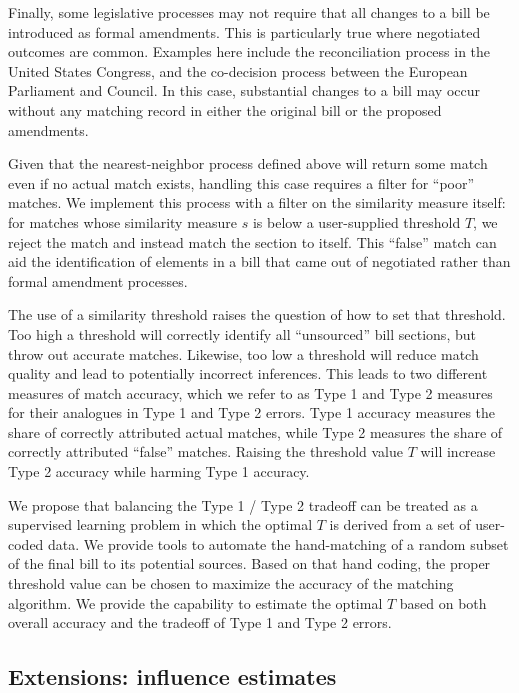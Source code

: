 \documentclass[11pt]{article}
\begin{document}
Finally, some legislative processes may not require that all changes
to a bill be introduced as formal amendments. This is particularly
true where negotiated outcomes are common. Examples here include the
reconciliation process in the United States Congress, and the
co-decision process between the European Parliament and Council. In
this case, substantial changes to a bill may occur without any
matching record in either the original bill or the proposed
amendments. 

Given that the nearest-neighbor process defined above will return some
match even if no actual match exists, handling this case requires a
filter for ``poor'' matches. We implement this process with a filter
on the similarity measure itself: for matches whose similarity
measure $s$ is below a user-supplied threshold $T$, we reject the
match and instead match the section to itself. This ``false'' match
can aid the identification of elements in a bill that
came out of negotiated rather than formal amendment processes. 

The use of a similarity threshold raises the question of how to set
that threshold. Too high a threshold will correctly identify all ``unsourced'' bill
sections, but throw out accurate matches. Likewise, too low a threshold
will reduce match quality and lead to potentially incorrect
inferences. This leads to two different measures of match accuracy,
which we refer to as Type 1 and Type 2 measures for their analogues in
Type 1 and Type 2 errors. Type 1 accuracy measures the share of
correctly attributed actual matches, while Type 2 measures the share
of correctly attributed ``false'' matches. Raising the threshold value
$T$ will increase Type 2 accuracy while harming Type 1
accuracy.  

We propose that balancing the Type 1 / Type 2 tradeoff can be treated
as a supervised learning problem
in which the optimal $T$ is derived from a set of user-coded data. We
provide tools to automate the hand-matching of a random subset of the
final bill to its potential sources. Based on that hand coding, the
proper threshold value can be chosen to maximize the accuracy of the
matching algorithm. We provide the capability to estimate the optimal
$T$ based on both overall accuracy and the tradeoff of Type 1 and Type
2 errors. 

\subsection{Extensions: influence estimates}
\label{sec:extens-infl-estim}
\end{document}
